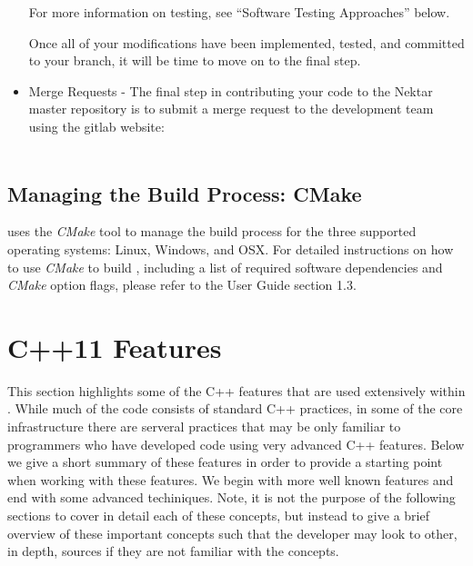 \begin{itemize}
  For more information on testing, see ``Software Testing Approaches'' below.

  Once all of your modifications have been implemented, tested, and
  committed to your branch, it will be time to move on to the final
  step. \\

\item Merge Requests - The final step in contributing your code to the
  Nektar master repository is to submit a merge request to the
  development team using the {\nek} gitlab website: \\
  
 \\
  
\end{itemize}

\subsection{Managing the Build Process: CMake}

{\nek} uses the \textit{CMake} tool to manage the build process for
the three supported operating systems: Linux, Windows, and OSX.  For
detailed instructions on how to use \textit{CMake} to build {\nek},
including a list of required software dependencies and \textit{CMake}
option flags, please refer to the {\nek} User Guide section 1.3.

\section{C++11 Features}

This section highlights some of the C++ features that are used
extensively within {\nek}. While much of the code consists of
standard C++ practices, in some of the core infrastructure there are
serveral practices that may be only familiar to programmers who have
developed code using very advanced C++ features.  Below we give a
short summary of these features in order to provide a starting point
when working with these features. We begin with more well known
features and end with some advanced techiniques.  Note, it is not the
purpose of the following sections to cover in detail each of these
concepts, but instead to give a brief overview of these important
concepts such that the developer may look to other, in depth, sources if
they are not familiar with the concepts.


